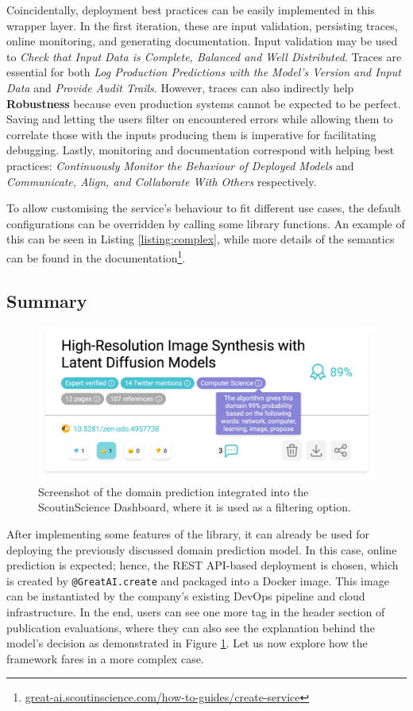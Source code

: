 \newpage

Coincidentally, deployment best practices can be easily implemented in this wrapper layer. In the first iteration, these are input validation, persisting traces, online monitoring, and generating documentation. Input validation may be used to \textit{Check that Input Data is Complete, Balanced and Well Distributed}. Traces are essential for both \textit{Log Production Predictions with the Model's Version and Input Data} and \textit{Provide Audit Trails}. However, traces can also indirectly help \textbf{Robustness} because even production systems cannot be expected to be perfect. Saving and letting the users filter on encountered errors while allowing them to correlate those with the inputs producing them is imperative for facilitating debugging. Lastly, monitoring and documentation correspond with helping best practices: \textit{Continuously Monitor the Behaviour of Deployed Models} and \textit{Communicate, Align, and Collaborate With Others} respectively.

To allow customising the service's behaviour to fit different use cases, the default configurations can be overridden by calling some library functions. An example of this can be seen in Listing \ref{listing:complex}, while more details of the semantics can be found in the documentation\footnote{\href{https://great-ai.scoutinscience.com/how-to-guides/create-service/}{great-ai.scoutinscience.com/how-to-guides/create-service}}.

\subsection{Summary}

\begin{figure}[H]
    \centering
    \includegraphics[width=0.8\linewidth]{figures/dashboard-domains.png}
    \captionsetup{width=.9\linewidth}
    \caption{Screenshot of the domain prediction integrated into the ScoutinScience Dashboard, where it is used as a filtering option.}
    \label{fig:dashboard-domains}
\end{figure}

After implementing some features of the library, it can already be used for deploying the previously discussed domain prediction model. In this case, online prediction is expected; hence, the REST API-based deployment is chosen, which is created by \texttt{@GreatAI.create} and packaged into a Docker image. This image can be instantiated by the company's existing DevOps pipeline and cloud infrastructure. In the end, users can see one more tag in the header section of publication evaluations, where they can also see the explanation behind the model's decision as demonstrated in Figure \ref{fig:dashboard-domains}. Let us now explore how the framework fares in a more complex case.
